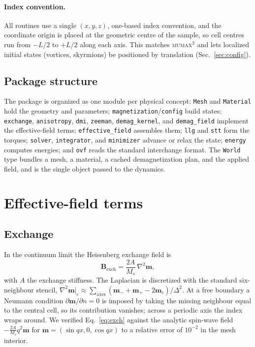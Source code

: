 \documentclass{article}      %
\newcommand{\mumax}{\textsc{mumax}$^3$}
\newcommand{\vm}{\bm{m}}
\newcommand{\vB}{\bm{B}}
\begin{document}
\paragraph{Index convention.}
All routines use a single $(x,y,z)$, one-based index convention, and the
coordinate origin is placed at the geometric centre of the sample, so cell
centres run from $-L/2$ to $+L/2$ along each axis. This matches \mumax{} and lets
localized initial states (vortices, skyrmions) be positioned by translation
(Sec.~\ref{sec:config}).

\subsection{Package structure}

The package is organized as one module per physical concept:
\texttt{Mesh} and \texttt{Material} hold the geometry and parameters;
\texttt{magnetization}/\texttt{config} build states; \texttt{exchange},
\texttt{anisotropy}, \texttt{dmi}, \texttt{zeeman}, \texttt{demag\_kernel},
and \texttt{demag\_field} implement the effective-field terms;
\texttt{effective\_field} assembles them; \texttt{llg} and \texttt{stt} form the
torques; \texttt{solver}, \texttt{integrator}, and \texttt{minimizer} advance or
relax the state; \texttt{energy} computes energies; and \texttt{ovf} reads the
standard interchange format. The \texttt{World} type bundles a mesh, a material,
a cached demagnetization plan, and the applied field, and is the single object
passed to the dynamics.

\section{Effective-field terms}
\label{sec:fields}

\subsection{Exchange}

In the continuum limit the Heisenberg exchange field is
%
\begin{equation}
  \vB_{\mathrm{exch}} = \frac{2A}{M_s}\,\nabla^2\vm,
  \label{eq:exch}
\end{equation}
%
with $A$ the exchange stiffness. The Laplacian is discretized with the standard
six-neighbour stencil,
$\nabla^2\vm|_c \approx \sum_{\text{axes}}(\vm_{-}+\vm_{+}-2\vm_c)/\Delta^2$.
At a free boundary a Neumann condition $\partial\vm/\partial n = 0$ is imposed by
taking the missing neighbour equal to the central cell, so its contribution
vanishes; across a periodic axis the index wraps around. We verified
Eq.~\eqref{eq:exch} against the analytic spin-wave field
$-\frac{2A}{M_s}q^2\vm$ for $\vm=(\sin qx,0,\cos qx)$ to a relative error of
$10^{-2}$ in the mesh interior.
\end{document}
